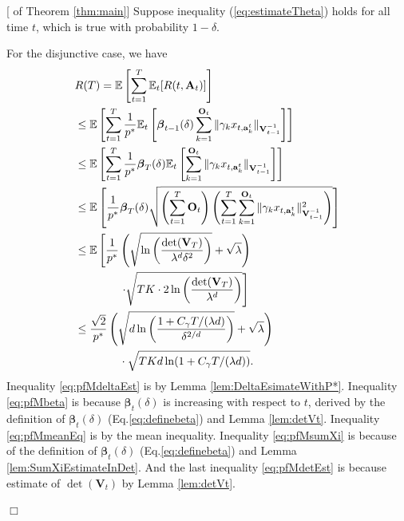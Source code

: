 \documentclass{article}
\newcommand{\bbeta}{\boldsymbol{\beta}}
\newcommand{\EE}{\mathbb{E}}
\newcommand{\bA}{\mathbf{A}}
\newcommand{\ba}{\mathbf{a}}
\newcommand{\bO}{\mathbf{O}}
\newcommand{\bV}{\mathbf{V}}
\newcommand{\norm}[1]{\| #1 \|}
\newenvironment{proof}{\noindent {\textbf{Proof. }}}{$\Box$ \medskip}
\begin{document}
\begin{proof}[ of Theorem \ref{thm:main}]
	Suppose inequality (\ref{eq:estimateTheta}) holds for all time $t$, which is true with probability $1-\delta$. 
	
	For the disjunctive case, we have
	\begin{align}
	&R(T) = \EE \left[\sum_{t=1}^{T} \EE_{t}[R(t, \bA_t)] \right] \notag\\
	&\leq \EE\left[\sum_{t=1}^{T} \frac{1}{p^*} \EE_t \left[\bbeta_{t-1}(\delta) \sum_{k=1}^{\bO_t}\norm{\gamma_k x_{t,\ba_k^t}}_{\bV_{t-1}^{-1}}\right] \right] \label{eq:pfMdeltaEst}\\
	&\leq \EE\left[\sum_{t=1}^{T} \frac{1}{p^*} \bbeta_{T}(\delta) \EE_t \left[ \sum_{k=1}^{\bO_t}\norm{\gamma_k x_{t,\ba_k^t}}_{\bV_{t-1}^{-1}}\right] \right] \label{eq:pfMbeta}\\
	&\leq \EE \left[\frac{1}{p^*} \bbeta_T(\delta) \sqrt{\left(\sum_{t=1}^{T} \bO_t\right) \left( \sum_{t=1}^{T} \sum_{k=1}^{\bO_t}\norm{\gamma_k x_{t,\ba_k^t}}_{\bV_{t-1}^{-1}}^2 \right)} \right ]  \label{eq:pfMmeanEq}\\
	&\leq \EE\left[\frac{1}{p^*} \left( \sqrt{ \ln \left( \frac{\det(\bV_T)}{\lambda^d \delta^2} \right)} + \sqrt{\lambda} \right) \right. \notag\\
	& \left. \qquad \qquad \cdot \sqrt{TK \cdot 2\ln \left(\frac{\det(\bV_T)}{\lambda^d} \right)} \right] \label{eq:pfMsumXi}\\
	&\leq \frac{\sqrt{2}}{p^*} \left(\sqrt{ d \ln \left( \frac{1 + C_\gamma T/(\lambda d)}{\delta^{2/d}} \right) } + \sqrt{\lambda} \right) \notag\\
	&\qquad \qquad \cdot \sqrt{TKd\ln(1 + C_\gamma T/(\lambda d))}. \label{eq:pfMdetEst}
	\end{align}
	Inequality \eqref{eq:pfMdeltaEst} is by Lemma \ref{lem:DeltaEsimateWithP*}. 
	Inequality \eqref{eq:pfMbeta} is because $\bbeta_{t}(\delta)$ is increasing with respect to $t$, derived by the definition of $\bbeta_t(\delta)$ (Eq.\eqref{eq:definebeta}) and Lemma \ref{lem:detVt}. 
	Inequality \eqref{eq:pfMmeanEq} is by the mean inequality. 
	Inequality \eqref{eq:pfMsumXi} is because of the definition of $\bbeta_t(\delta)$ (Eq.\eqref{eq:definebeta}) and Lemma \ref{lem:SumXiEstimateInDet}. 
	And the last inequality \eqref{eq:pfMdetEst} is because estimate of $\det(\bV_t)$ by Lemma \ref{lem:detVt}.
	

\end{proof}
\end{document}

